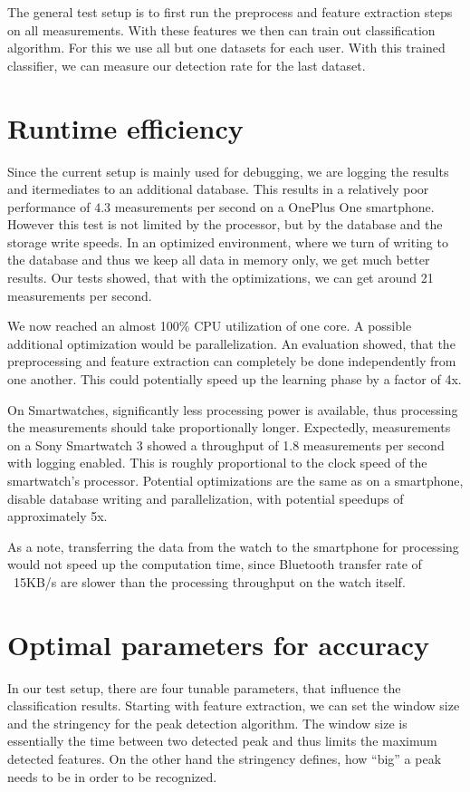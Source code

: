 The general test setup is to first run the preprocess and feature extraction steps on all measurements. With these features we then can train out classification algorithm. For this we use all but one datasets for each user. With this trained classifier, we can measure our detection rate for the last dataset.

\section{Runtime efficiency}
Since the current setup is mainly used for debugging, we are logging the results and itermediates to an additional database. This results in a relatively poor performance of $4.3$ measurements per second on a OnePlus One smartphone. However this test is not limited by the processor, but by the database and the storage write speeds. In an optimized environment, where we turn of writing to the database and thus we keep all data in memory only, we get much better results. Our tests showed, that with the optimizations, we can get around 21 measurements per second.

We now reached an almost 100\% CPU utilization of one core. A possible additional optimization would be parallelization. An evaluation showed, that the preprocessing and feature extraction can completely be done independently from one another. This could potentially speed up the learning phase by a factor of 4x.

On Smartwatches, significantly less processing power is available, thus processing the measurements should take proportionally longer. Expectedly, measurements on a Sony Smartwatch 3 showed a throughput of 1.8 measurements per second with logging enabled. This is roughly proportional to the clock speed of the smartwatch's processor. Potential optimizations are the same as on a smartphone, \ie disable database writing and parallelization, with potential speedups of approximately 5x. 

As a note, transferring the data from the watch to the smartphone for processing would not speed up the computation time, since Bluetooth transfer rate of ~15KB/s are slower than the processing throughput on the watch itself.

\section{Optimal parameters for accuracy}
In our test setup, there are four tunable parameters, that influence the classification results. Starting with feature extraction, we can set the window size and the stringency for the peak detection algorithm. The window size is essentially the time between two detected peak and thus limits the maximum detected features. On the other hand the stringency defines, how ``big'' a peak needs to be in order to be recognized.

